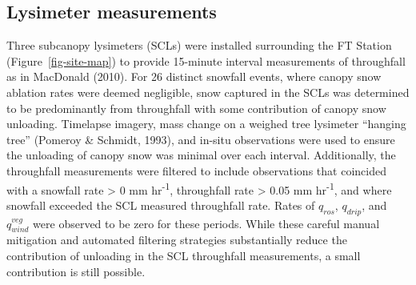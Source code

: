 \documentclass[
  letterpaper,
  DIV=11,
  numbers=noendperiod]{scrartcl}
\begin{document}
\subsection{Lysimeter measurements}\label{lysimeter-measurements}

Three subcanopy lysimeters (SCLs) were installed surrounding the FT
Station (Figure~\ref{fig-site-map}) to provide 15-minute interval
measurements of throughfall as in MacDonald (2010). For 26 distinct
snowfall events, where canopy snow ablation rates were deemed
negligible, snow captured in the SCLs was determined to be predominantly
from throughfall with some contribution of canopy snow unloading.
Timelapse imagery, mass change on a weighed tree lysimeter ``hanging
tree'' (Pomeroy \& Schmidt, 1993), and in-situ observations were used to
ensure the unloading of canopy snow was minimal over each interval.
Additionally, the throughfall measurements were filtered to include
observations that coincided with a snowfall rate \textgreater{} 0 mm
hr\textsuperscript{-1}, throughfall rate \textgreater{} 0.05 mm
hr\textsuperscript{-1}, and where snowfall exceeded the SCL measured
throughfall rate. Rates of \(q_{ros}\), \(q_{drip}\), and
\(q_{wind}^{veg}\) were observed to be zero for these periods. While
these careful manual mitigation and automated filtering strategies
substantially reduce the contribution of unloading in the SCL
throughfall measurements, a small contribution is still possible.
\end{document}
